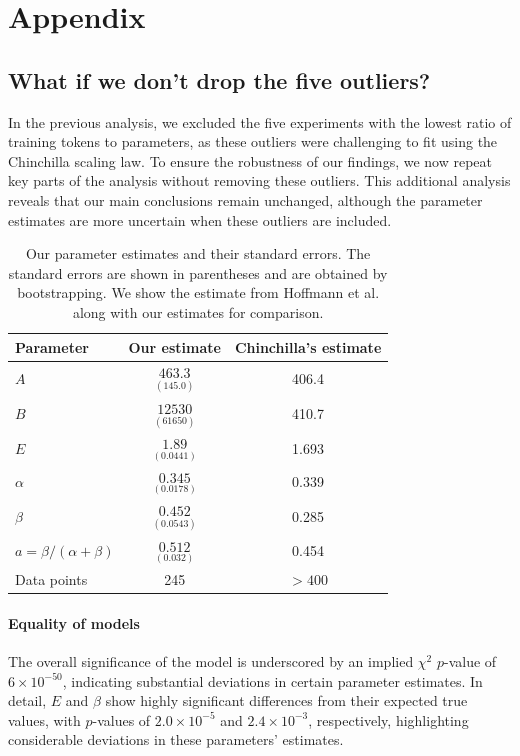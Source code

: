 \documentclass[twocolumn]{article}
\begin{document}
\appendix
\section{Appendix}

\subsection{What if we don't drop the five outliers?}

\label{sec:what-if}

In the previous analysis, we excluded the five experiments with the lowest ratio of training tokens to parameters, as these outliers were challenging to fit using the Chinchilla scaling law. To ensure the robustness of our findings, we now repeat key parts of the analysis without removing these outliers. This additional analysis reveals that our main conclusions remain unchanged, although the parameter estimates are more uncertain when these outliers are included.

\begin{table}[ht]
\small
\centering
\begin{tabular}{@{}lcc@{}}
\toprule
Parameter & Our estimate & Chinchilla's estimate\\ \midrule
$A$ & $\underset{(145.0)}{463.3}$ & 406.4 \\
$B$ & $\underset{(61650)}{12530}$ & 410.7 \\
$E$ & $\underset{(0.0441)}{1.89}$ & 1.693 \\
$\alpha$ & $\underset{(0.0178)}{0.345}$ & 0.339 \\
$\beta$ & $\underset{(0.0543)}{0.452}$ & 0.285 \\
$a = \beta/(\alpha+\beta)$ & $\underset{(0.032)}{0.512}$ & 0.454 \\
\midrule
Data points & 245 & $ > 400 $ \\ \bottomrule
\end{tabular}
   \caption[Caption]{Our parameter estimates and their standard errors. The standard errors are shown in parentheses and are obtained by bootstrapping. We show the estimate from Hoffmann et al. along with our estimates for comparison.\protect\footnotemark}
\label{tab:param-estimates} 
\end{table}

\paragraph{Equality of models} The overall significance of the model is underscored by an implied $\chi^2$ $p$-value of $6 \times 10^{-50}$, indicating substantial deviations in certain parameter estimates. In detail, $E$ and $\beta$ show highly significant differences from their expected true values, with $p$-values of $2.0 \times 10^{-5}$ and $2.4 \times 10^{-3}$, respectively, highlighting considerable deviations in these parameters' estimates.
\end{document}
